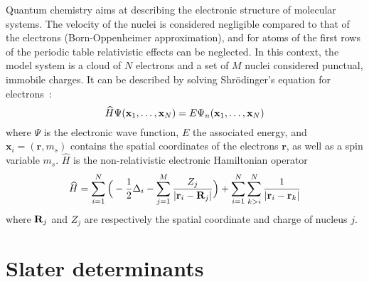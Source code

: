 \documentclass[./thesis.tex]{subfiles}
\begin{document}
Quantum chemistry aims at describing the electronic structure of molecular
systems.  The velocity of the nuclei is considered negligible compared to that
of the electrons (Born-Oppenheimer approximation), and for atoms of the first
rows of the periodic table relativistic effects can be neglected.  In this
context, the model system is a cloud of $N$ electrons and a set of $M$ nuclei
considered punctual, immobile charges. It can be described by solving
Shrödinger's equation for electrons~:
\begin{equation}
 \widehat{H} \Psi({\bf x}_1,\dots,{\bf x}_N) = E \Psi_n({\bf x}_1,\dots,{\bf x}_N)
\end{equation}
where $\Psi$ is the electronic wave function, $E$ the associated energy, and $\mathbf{x}_i = (\textbf{r},m_s)$
contains the spatial coordinates of the electrons $\textbf{r}$, as well as a spin variable $m_s$.
$\widehat H$ is the non-relativistic electronic Hamiltonian operator
\begin{equation}
\widehat{H} = \sum_{i=1}^{N} \Big ( -\frac{1}{2} \Delta_i - \sum_{j=1}^M \frac{Z_j}{|{\bf r}_i - {\bf R}_j|} \Big ) + \sum_{i=1}^{N} \sum_{k>i}^{N} \frac{1}{|{\bf r}_i - {\bf r}_k|}
\end{equation}
where ${\bf R}_j$ and $Z_j$ are respectively the spatial coordinate and charge of nucleus $j$.

\section{Slater determinants}
\end{document}
